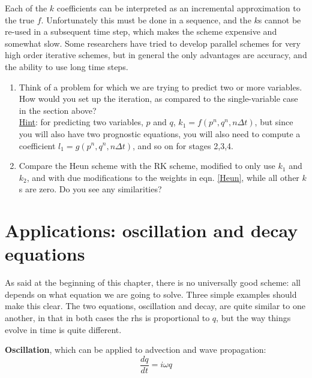 Each of the $k$ coefficients can be interpreted as an incremental approximation to the true $f$. Unfortunately this must be done in a sequence, and the $k$s cannot be re-used in a subsequent time step, which makes the scheme expensive and somewhat slow. Some researchers have tried to develop parallel schemes for very high order iterative schemes, but in general the only advantages are accuracy, and the ability to use long time steps.

\begin{exercise}
\begin{enumerate}
	\item Think of a problem for which we are trying to predict two or more variables. How would you set up the iteration, as compared to the single-variable case in the section above?\\
	\underline{Hint}: for predicting two variables, $p$ and $q$, $k_1 = f \left( p^n, q^n, n \Delta t\right)$, but since you will also have two prognostic equations, you will also need to compute a coefficient $l_1 = g \left( p^n, q^n, n \Delta t\right)$, and so on for stages 2,3,4.
	\item Compare the Heun scheme with the RK scheme, modified to only use $k_1$ and $k_2$, and with due modifications to the weights in eqn. \ref{Heun}, while all other $k$s are zero. Do you see any similarities?
\end{enumerate}
\end{exercise}

\clearpage
	
\section{Applications: oscillation and decay equations}
As said at the beginning of this chapter, there is no universally good scheme: all depends on what equation we are going to solve. Three simple examples should make this clear. The two equations, oscillation and decay, are quite similar to one another, in that in both cases the rhs is proportional to $q$, but the way things evolve in time is quite different.

{\bf Oscillation}, which can be applied to advection and wave propagation:
\begin{equation}
	\frac{dq}{dt}= i \omega q
	\label{oscillation}
\end{equation}

